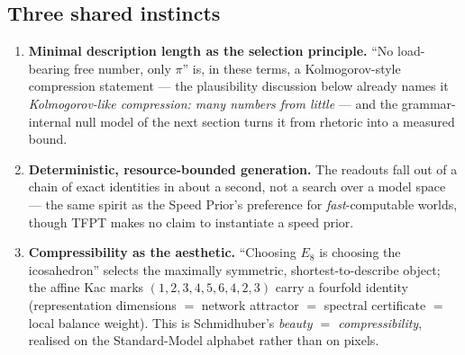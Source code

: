 \documentclass[11pt,a4paper]{article}
\begin{document}
\subsection*{Three shared instincts}
\begin{enumerate}[leftmargin=1.6em,itemsep=2pt,topsep=2pt]
\item \textbf{Minimal description length as the selection principle.} ``No load-bearing
      free number, only $\pi$'' is, in these terms, a Kolmogorov-style compression
      statement --- the plausibility discussion below already names it
      \emph{Kolmogorov-like compression: many numbers from little} --- and the
      grammar-internal null model of the next section turns it from rhetoric into a
      measured bound.
\item \textbf{Deterministic, resource-bounded generation.} The readouts fall out of a
      chain of exact identities in about a second, not a search over a model space ---
      the same spirit as the Speed Prior's preference for \emph{fast}-computable worlds,
      though TFPT makes no claim to instantiate a speed prior.
\item \textbf{Compressibility as the aesthetic.} ``Choosing $E_8$ is choosing the
      icosahedron'' selects the maximally symmetric, shortest-to-describe object; the
      affine Kac marks $(1,2,3,4,5,6,4,2,3)$ carry a fourfold identity (representation
      dimensions $=$ network attractor $=$ spectral certificate $=$ local balance
      weight). This is Schmidhuber's \emph{beauty $=$ compressibility}, realised on the
      Standard-Model alphabet rather than on pixels.
\end{enumerate}
\end{document}
